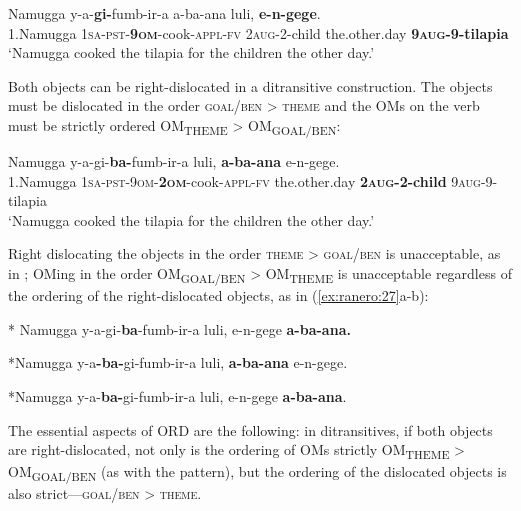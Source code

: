 \documentclass[output=paper,newtxmath,modfonts,nonflat,hidelinks]{langsci/langscibook}
\begin{document}
\ea\label{ex:ranero:24}
\gll Namugga    y-a-\textbf{gi-}fumb-ir-a        a-ba-ana        luli,    \textbf{e-n-gege}.\\
1.Namugga \textsc{1sa-pst-}\textbf{\textsc{9om}}{}-cook-\textsc{appl-fv} 2\textsc{aug}{}-2-child the.other.day \textbf{9\textsc{aug}}\textbf{{}-9-tilapia}\\
\glt ‘Namugga cooked the tilapia for the children the other day.’
\z

Both objects can be right-dislocated in a ditransitive construction. The objects must be dislocated in the order \textsc{goal/ben > theme} and the OMs on the verb must be strictly ordered OM\textsubscript{THEME} > OM\textsubscript{GOAL/BEN}:


\ea\label{ex:ranero:25}
\gll Namugga     y-a-gi{}-\textbf{ba-}fumb-ir-a                     luli,                \textbf{a-ba-ana}      e-n-gege.\\
1.Namugga \textsc{1sa-pst-9om}\textsc{{}-}\textbf{\textsc{2om}}{}-cook-\textsc{appl-fv} the.other.day \textbf{2\textsc{aug}}\textbf{{}-2-child} 9\textsc{aug}{}-9-tilapia\\
\glt ‘Namugga cooked the tilapia for the children the other day.’
\z

Right dislocating the objects in the order \textsc{theme > goal/ben} is unacceptable, as in ; OMing in the order OM\textsubscript{GOAL/BEN} > OM\textsubscript{THEME} is unacceptable regardless of the ordering of the right-dislocated objects, as in (\ref{ex:ranero:27}a-b):

\ea\label{ex:ranero:26}
* Namugga y-a-gi{}-\textbf{ba}{}-fumb-ir-a luli, e-n-gege \textbf{a-ba-ana.}
\z

\ea\label{ex:ranero:27}
\ea\label{ex:ranero:27a}

*Namugga y-a\textbf{{}-ba-}gi{}-fumb-ir-a luli, \textbf{a-ba-ana} e-n-gege.

\ex\label{ex:ranero:27b}
*Namugga y-a-\textbf{ba-}gi{}-fumb-ir-a luli, e-n-gege \textbf{a-ba-ana}.
\z
\z

The essential aspects of ORD are the following: in ditransitives, if both objects are right-dislocated, not only is the ordering of OMs strictly OM\textsubscript{THEME} > OM\textsubscript{GOAL/BEN} (as with the  pattern), but the ordering of the dislocated objects is also strict—\textsc{goal/ben > theme}. 
\end{document}
